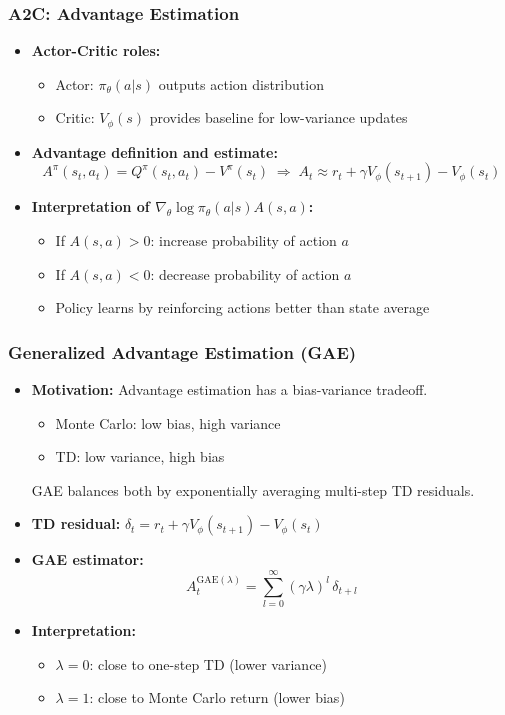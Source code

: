 \documentclass[11pt,aspectratio=169,xcolor={dvipsnames},usepdftitle=false]{beamer}
\begin{document}
\begin{frame}
\frametitle{A2C: Advantage Estimation}
\begin{itemize}

	\item \textbf{Actor-Critic roles:}
	\begin{itemize}
		\item Actor: $\pi_\theta(a|s)$ outputs action distribution
		\item Critic: $V_\phi(s)$ provides baseline for low-variance updates
	\end{itemize}

	\item \textbf{Advantage definition and estimate:}
	$$
	A^\pi(s_t,a_t)=Q^\pi(s_t,a_t)-V^\pi(s_t)\;\Rightarrow\;A_t\approx r_t+\gamma V_\phi(s_{t+1})-V_\phi(s_t)
	$$

	\item \textbf{Interpretation of $\nabla_\theta\log\pi_\theta(a|s)A(s,a)$:}
	\begin{itemize}
		\item If $A(s,a)>0$: increase probability of action $a$
		\item If $A(s,a)<0$: decrease probability of action $a$
		\item Policy learns by reinforcing actions better than state average
	\end{itemize}

\end{itemize}
\end{frame}


\begin{frame}
\frametitle{Generalized Advantage Estimation (GAE)}
\begin{itemize}

	\item \textbf{Motivation:}
	Advantage estimation has a bias-variance tradeoff.
    \begin{itemize} 
        \item Monte Carlo: low bias, high variance
        \item TD: low variance, high bias
    \end{itemize}
	GAE balances both by exponentially averaging multi-step TD residuals.

	\item \textbf{TD residual:} \quad $\delta_t = r_t + \gamma V_\phi(s_{t+1}) - V_\phi(s_t)$

	\item \textbf{GAE estimator:}
	$$
	A_t^{\mathrm{GAE}(\lambda)} = \sum_{l=0}^{\infty}(\gamma\lambda)^l\,\delta_{t+l}
	$$

	\item \textbf{Interpretation:}
	\begin{itemize}
		\item $\lambda=0$: close to one-step TD (lower variance)
		\item $\lambda=1$: close to Monte Carlo return (lower bias)
	\end{itemize}

\end{itemize}
\end{frame}
\end{document}
